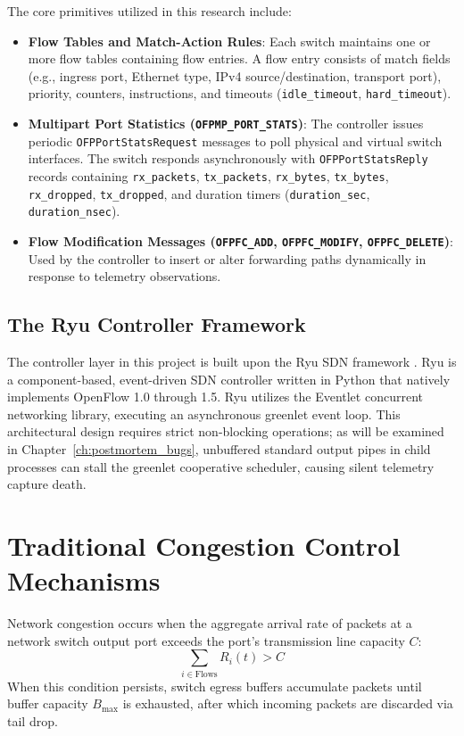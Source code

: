The core primitives utilized in this research include:
\begin{itemize}[leftmargin=1.5em]
  \item \textbf{Flow Tables and Match-Action Rules}: Each switch maintains one or more flow tables containing flow entries. A flow entry consists of match fields (e.g., ingress port, Ethernet type, IPv4 source/destination, transport port), priority, counters, instructions, and timeouts (\texttt{idle\_timeout}, \texttt{hard\_timeout}).
  \item \textbf{Multipart Port Statistics (\texttt{OFPMP\_PORT\_STATS})}: The controller issues periodic \texttt{OFPPortStatsRequest} messages to poll physical and virtual switch interfaces. The switch responds asynchronously with \texttt{OFPPortStatsReply} records containing \texttt{rx\_packets}, \texttt{tx\_packets}, \texttt{rx\_bytes}, \texttt{tx\_bytes}, \texttt{rx\_dropped}, \texttt{tx\_dropped}, and duration timers (\texttt{duration\_sec}, \texttt{duration\_nsec}).
  \item \textbf{Flow Modification Messages (\texttt{OFPFC\_ADD}, \texttt{OFPFC\_MODIFY}, \texttt{OFPFC\_DELETE})}: Used by the controller to insert or alter forwarding paths dynamically in response to telemetry observations.
\end{itemize}

\subsection{The Ryu Controller Framework}
The controller layer in this project is built upon the Ryu SDN framework \cite{fujimoto2016ryu}. Ryu is a component-based, event-driven SDN controller written in Python that natively implements OpenFlow 1.0 through 1.5. Ryu utilizes the Eventlet concurrent networking library, executing an asynchronous greenlet event loop. This architectural design requires strict non-blocking operations; as will be examined in Chapter~\ref{ch:postmortem_bugs}, unbuffered standard output pipes in child processes can stall the greenlet cooperative scheduler, causing silent telemetry capture death.

\section{Traditional Congestion Control Mechanisms}
Network congestion occurs when the aggregate arrival rate of packets at a network switch output port exceeds the port's transmission line capacity $C$:
\begin{equation}
  \sum_{i \in \text{Flows}} R_i(t) > C
\end{equation}
When this condition persists, switch egress buffers accumulate packets until buffer capacity $B_{\text{max}}$ is exhausted, after which incoming packets are discarded via tail drop.

